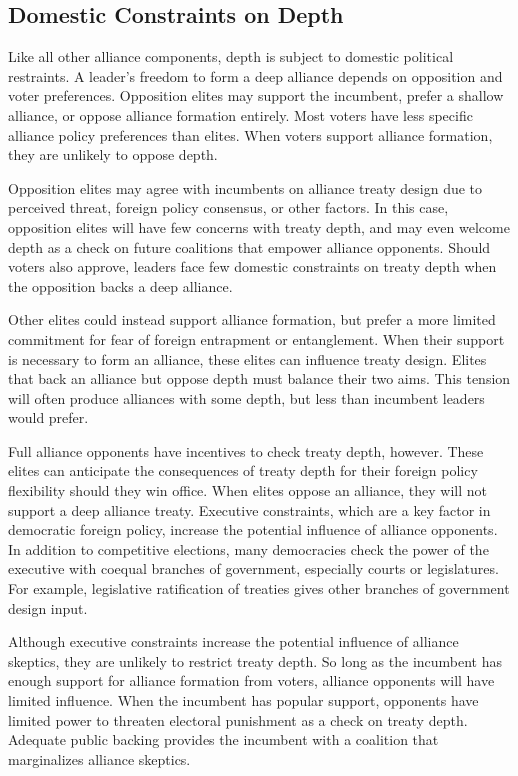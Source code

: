 \documentclass[12pt]{article}
\begin{document}
\subsection{Domestic Constraints on Depth} 

Like all other alliance components, depth is subject to domestic political restraints. 
A leader's freedom to form a deep alliance depends on opposition and voter preferences.
Opposition elites may support the incumbent, prefer a shallow alliance, or oppose alliance formation entirely. 
Most voters have less specific alliance policy preferences than elites. 
When voters support alliance formation, they are unlikely to oppose depth.


Opposition elites may agree with incumbents on alliance treaty design due to perceived threat, foreign policy consensus, or other factors. 
In this case, opposition elites will have few concerns with treaty depth, and may even welcome depth as a check on future coalitions that empower alliance opponents. 
Should voters also approve, leaders face few domestic constraints on treaty depth when the opposition backs a deep alliance. 


Other elites could instead support alliance formation, but prefer a more limited commitment for fear of foreign entrapment or entanglement. 
When their support is necessary to form an alliance, these elites can influence treaty design.
Elites that back an alliance but oppose depth must balance their two aims.
This tension will often produce alliances with some depth, but less than incumbent leaders would prefer.  


Full alliance opponents have incentives to check treaty depth, however.
These elites can anticipate the consequences of treaty depth for their foreign policy flexibility should they win office.
When elites oppose an alliance, they will not support a deep alliance treaty.  
Executive constraints, which are a key factor in democratic foreign policy, increase the potential influence of alliance opponents.   
In addition to competitive elections, many democracies check the power of the executive with coequal branches of government, especially courts or legislatures.
For example, legislative ratification of treaties gives other branches of government design input. 


Although executive constraints increase the potential influence of alliance skeptics, they are unlikely to restrict treaty depth. 
So long as the incumbent has enough support for alliance formation from voters, alliance opponents will have limited influence.
When the incumbent has popular support, opponents have limited power to threaten electoral punishment as a check on treaty depth. 
Adequate public backing provides the incumbent with a coalition that marginalizes alliance skeptics. 
\end{document}
